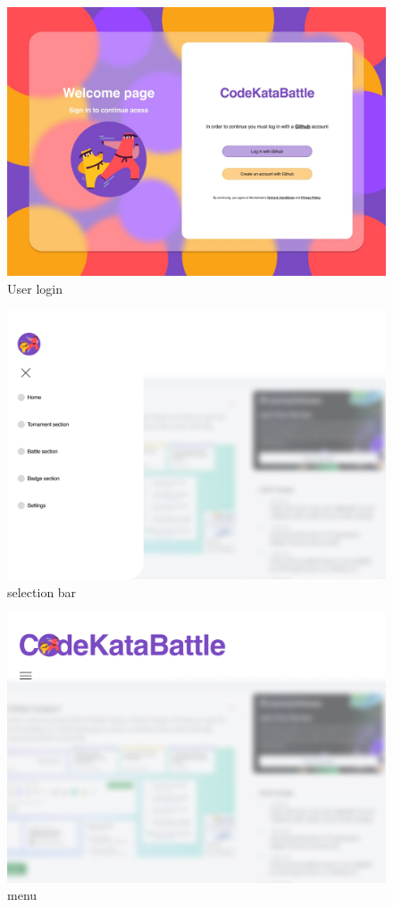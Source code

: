 \begin{figure}[!h]
    
        \centering
        \includegraphics[width= 13cm]{Images/login_interface.jpg}
        \caption{User login}
        \label{fig:enter-label}
    \end{figure}


\begin{figure}[!h]
    
        \centering
        \includegraphics[width= 13cm]{Images/select_interface.jpg}
        \caption{selection bar}
        \label{fig:enter-label}
\end{figure}


\begin{figure}[!h]
    
        \centering
        \includegraphics[width= 13cm]{Images/dashboard_access.jpg}
        \caption{menu}
        \label{fig:enter-label}
\end{figure}

